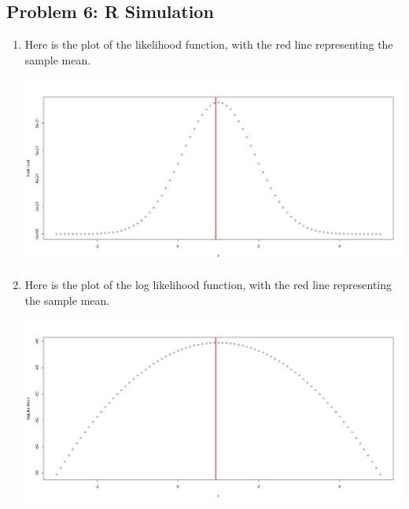 \documentclass{article}
\begin{document}
\subsection*{Problem 6: R Simulation}
\begin{enumerate}
	\item Here is the plot of the likelihood function, with the red line
	representing the sample mean.

	\includegraphics*[scale=0.35]{hw3likelihood.png}

	\item Here is the plot of the log likelihood function, with the red line
	representing the sample mean.

	\includegraphics*[scale=0.35]{hw3loglikelihood.png}
\end{enumerate}
\end{document}
